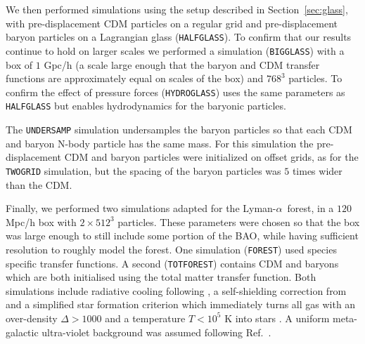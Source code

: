 \documentclass[a4paper,11pt]{article}
\newcommand{\Lya}{Lyman-$\alpha$}
\begin{document}
We then performed simulations using the setup described in Section~\ref{sec:glass}, with pre-displacement CDM particles on a regular grid and pre-displacement baryon particles on a Lagrangian glass (\texttt{HALFGLASS}). To confirm that our results continue to hold on larger scales we performed a simulation (\texttt{BIGGLASS}) with a box of $1$ Gpc/h (a scale large enough that the baryon and CDM transfer functions are approximately equal on scales of the box) and $768^3$ particles. To confirm the effect of pressure forces (\texttt{HYDROGLASS}) uses the same parameters as \texttt{HALFGLASS} but enables hydrodynamics for the baryonic particles.

The \texttt{UNDERSAMP} simulation undersamples the baryon particles so that each CDM and baryon N-body particle has the same mass. For this simulation the pre-displacement CDM and baryon particles were initialized on offset grids, as for the \texttt{TWOGRID} simulation, but the spacing of the baryon particles was $5$ times wider than the CDM.

Finally, we performed two simulations adapted for the \Lya~forest, in a $120$ Mpc/h box with $2\times 512^3$ particles. These parameters were chosen so that the box was large enough to still include some portion of the BAO, while having sufficient resolution to roughly model the forest. One simulation (\texttt{FOREST}) used species specific transfer functions. A second (\texttt{TOTFOREST}) contains CDM and baryons which are both initialised using the total matter transfer function. Both simulations include radiative cooling following \cite{Katz:1996}, a self-shielding correction from \cite{Rahmati:2013} and a simplified star formation criterion which immediately turns all gas with an over-density $\Delta > 1000$ and a temperature $T < 10^5$ K into stars \cite{Viel:2004}. A uniform meta-galactic ultra-violet background was assumed following Ref.~\cite{Puchwein:2018}.
\end{document}

